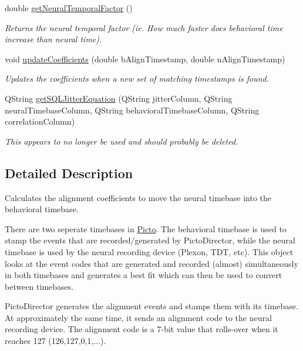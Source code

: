 \begin{DoxyCompactItemize}
double \hyperlink{class_alignment_tool_ad34d5ba3dbada7d66573d725377298f2}{get\-Neural\-Temporal\-Factor} ()
\begin{DoxyCompactList}\small\item\em Returns the neural temporal factor (ie. How much faster does behavioral time increase than neural time). \end{DoxyCompactList}\item 
void \hyperlink{class_alignment_tool_a2c7eadcedb53d5e7f282168c8da3d457}{update\-Coefficients} (double b\-Align\-Timestamp, double n\-Align\-Timestamp)
\begin{DoxyCompactList}\small\item\em Updates the coefficients when a new set of matching timestamps is found. \end{DoxyCompactList}\item 
\hypertarget{class_alignment_tool_abb3151fc1fe9fad725d0c16c503ed8d8}{Q\-String \hyperlink{class_alignment_tool_abb3151fc1fe9fad725d0c16c503ed8d8}{get\-S\-Q\-L\-Jitter\-Equation} (Q\-String jitter\-Column, Q\-String neural\-Timebase\-Column, Q\-String behavioral\-Timebase\-Column, Q\-String correlation\-Column)}\label{class_alignment_tool_abb3151fc1fe9fad725d0c16c503ed8d8}

\begin{DoxyCompactList}\small\item\em This appears to no longer be used and should probably be deleted. \end{DoxyCompactList}\end{DoxyCompactItemize}


\subsection{Detailed Description}
Calculates the alignment coefficients to move the neural timebase into the behavioral timebase. 

There are two seperate timebases in \hyperlink{namespace_picto}{Picto}. The behavioral timebase is used to stamp the events that are recorded/generated by Picto\-Director, while the neural timebase is used by the neural recording device (Plexon, T\-D\-T, etc). This object looks at the event codes that are generated and recorded (almost) simultaneously in both timebases and generates a best fit which can then be used to convert between timebases.

Picto\-Director generates the alignment events and stamps them with its timebase. At approximately the same time, it sends an alignment code to the neural recording device. The alignment code is a 7-\/bit value that rolls-\/over when it reaches 127 (126,127,0,1,...).

